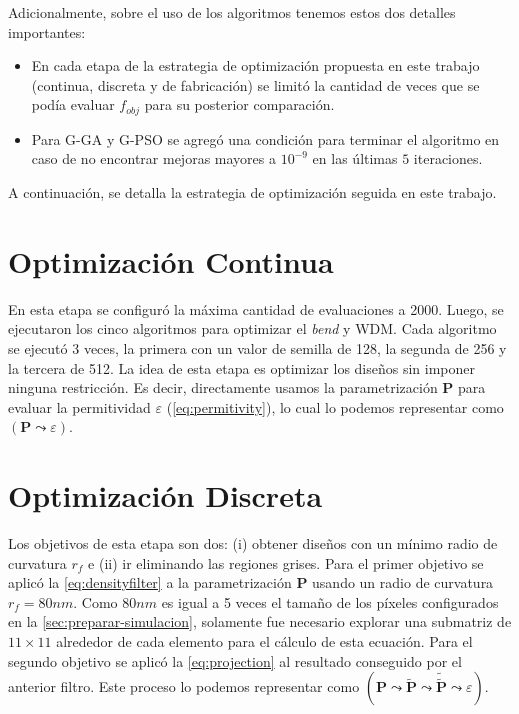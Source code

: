 Adicionalmente, sobre el uso de los algoritmos tenemos estos dos detalles importantes:

\begin{itemize}
  \item En cada etapa de la estrategia de optimización propuesta en este trabajo (continua, discreta y de fabricación)
        se limitó la cantidad de veces que se podía evaluar $f_{obj}$ para su posterior comparación.
  \item Para G-GA y G-PSO se agregó una condición para terminar el algoritmo
en caso de no encontrar mejoras mayores a $10^{-9}$ en las últimas $5$ iteraciones.
\end{itemize}

A continuación, se detalla la estrategia de optimización seguida en este trabajo.

\section{Optimización Continua}

En esta etapa se configuró la máxima cantidad de evaluaciones a 2000.
Luego, se ejecutaron los cinco algoritmos para optimizar el \emph{bend} y WDM.
Cada algoritmo se ejecutó 3 veces, la primera con un valor de semilla de 128, la segunda de 256 y
la tercera de 512.
La idea de esta etapa es optimizar los diseños sin imponer ninguna restricción.
Es decir, directamente usamos la parametrización $\boldsymbol{P}$ para evaluar la permitividad 
$\varepsilon$ (\autoref{eq:permitivity}),
lo cual lo podemos representar como $(\boldsymbol{P} \mathrel{\leadsto} \varepsilon)$.

\section{Optimización Discreta}

Los objetivos de esta etapa son dos: (i) obtener diseños con un mínimo radio de curvatura $r_f$ e
(ii) ir eliminando las regiones grises.
Para el primer objetivo se aplicó la \autoref{eq:densityfilter} a la parametrización 
$\boldsymbol{P}$ usando un radio de curvatura $r_f = 80 nm$.
Como $80nm$ es igual a 5 veces el tamaño de los píxeles configurados en la \autoref{sec:preparar-simulacion},
solamente fue necesario explorar una submatriz de $11 \times 11$ alrededor de cada elemento para el cálculo de
esta ecuación.
Para el segundo objetivo se aplicó la \autoref{eq:projection} al resultado conseguido por el anterior filtro.
Este proceso lo podemos representar como 
$(\boldsymbol{P} \mathrel{\leadsto} \widetilde{\boldsymbol{P}} \mathrel{\leadsto}
\widetilde{\widetilde{\boldsymbol{P}}} \mathrel{\leadsto} \varepsilon)$.

